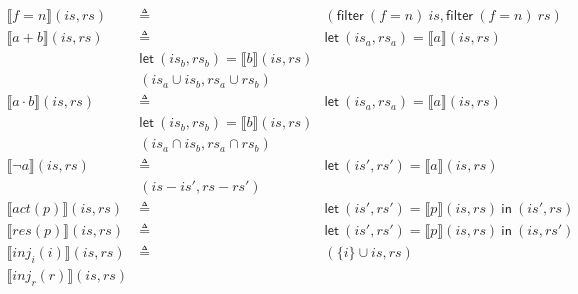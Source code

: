 \documentclass[12pt, letterpaper]{article}
\begin{document}
	\begin{align*}
		\llbracket f=n \rrbracket(\mathit{is}, \mathit{rs})
				& \triangleq &
                (\mathsf{filter}\ (f=n)\ \mathit{is},
                \mathsf{filter}\ (f=n)\ \mathit{rs}) \\
		\llbracket a + b \rrbracket(\mathit{is}, \mathit{rs})
		& \triangleq &
                \mathsf{let}\ (\mathit{is}_a,\mathit{rs}_a) = \llbracket a \rrbracket(\mathit{is}, \mathit{rs}) \\
                &\mathsf{let}\ (\mathit{is}_b,\mathit{rs}_b) =
                \llbracket b \rrbracket(\mathit{is}, \mathit{rs}) \\
                &(\mathit{is}_a \cup \mathit{is}_b,\mathit{rs}_a \cup \mathit{rs}_b) \\
		\llbracket a \cdot b \rrbracket(\mathit{is}, \mathit{rs})
		& \triangleq &
                \mathsf{let}\ (\mathit{is}_a,\mathit{rs}_a) = \llbracket a \rrbracket(\mathit{is}, \mathit{rs}) \\
                &\mathsf{let}\ (\mathit{is}_b,\mathit{rs}_b) =
                \llbracket b \rrbracket(\mathit{is}, \mathit{rs}) \\
                &(\mathit{is}_a \cap \mathit{is}_b,\mathit{rs}_a \cap \mathit{rs}_b) \\
		\llbracket \neg a \rrbracket(\mathit{is}, \mathit{rs})
		& \triangleq &
                \mathsf{let}\ (\mathit{is}',\mathit{rs}') = \llbracket a \rrbracket(\mathit{is}, \mathit{rs}) \\
                &(\mathit{is} - \mathit{is}',\mathit{rs} - \mathit{rs}') \\
		\llbracket act(p) \rrbracket(\mathit{is}, \mathit{rs})
			& \triangleq &
		\mathsf{let}\ (\mathit{is}',\mathit{rs}')
                = \llbracket p\rrbracket(\mathit{is}, \mathit{rs})\ 
                \mathsf{in}\ (\mathit{is}',\mathit{rs})
			\\
		\llbracket res(p) \rrbracket(\mathit{is}, \mathit{rs})
			& \triangleq &
		\mathsf{let}\ (\mathit{is}',\mathit{rs}')
                = \llbracket p\rrbracket(\mathit{is}, \mathit{rs})\ 
                \mathsf{in}\ (\mathit{is},\mathit{rs}')
			\\
		\llbracket inj_{i}(i) \rrbracket(\mathit{is}, \mathit{rs})
			& \triangleq &
			(\{i\} \cup \mathit{is}, \mathit{rs})
			\\
		\llbracket inj_{r}(r) \rrbracket(\mathit{is}, \mathit{rs})

\end{align*}
\end{document}
